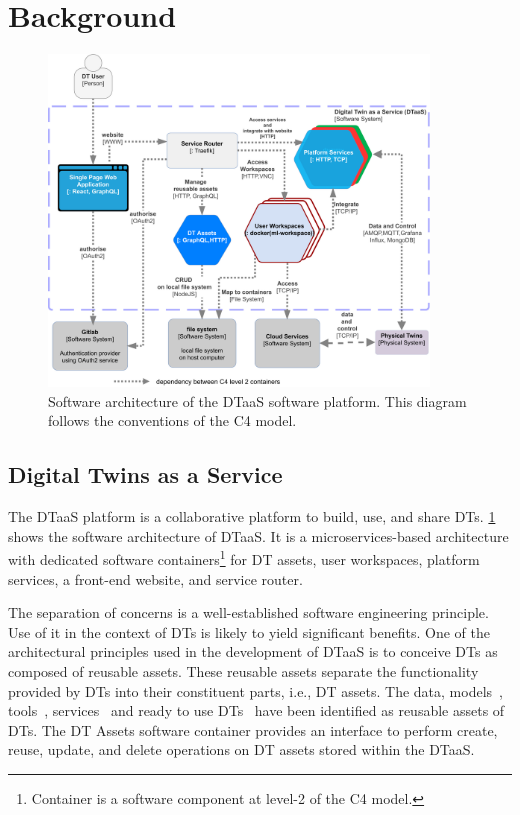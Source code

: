 \section{Background}\label{sec:background}
%
\begin{figure}[ht]
    \centering
    \includegraphics[width=0.9\textwidth]{images/DTaaS-architecture.pdf}
    \caption{Software architecture of the DTaaS software platform. This diagram follows the conventions of the C4 model.}
    \label{fig:dtaas-architecture}
\end{figure}%
%
\subsection{Digital Twins as a Service}
The DTaaS platform is a collaborative platform to build, use, and share DTs. \cref{fig:dtaas-architecture} shows the software architecture of DTaaS. It is a microservices-based architecture with dedicated software containers\footnote{Container is a software component at level-2 of the C4 model.} for DT assets, user workspaces, platform services, a front-end website, and service router.

The separation of concerns is a well-established software engineering principle.
Use of it in the context of DTs is likely to yield significant benefits. One of the architectural principles used in the development of DTaaS is to conceive DTs as composed of reusable assets. These reusable assets separate the functionality provided by DTs into their constituent parts, i.e., DT assets.
The data, models~\cite{Zambrano&22}, tools~\cite{qi2021enabling}, services~\cite{budiardjo2021digital,robles2023opentwins} and ready to use DTs~\cite{aziz2023distributed} have been identified as reusable assets of DTs.
The DT Assets software container provides an interface to perform create, reuse, update, and delete operations on DT assets stored within the DTaaS.

